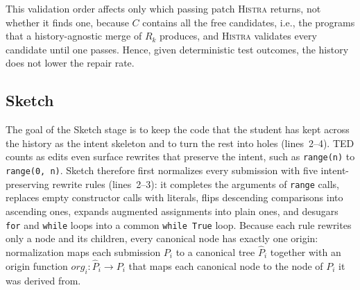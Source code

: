\documentclass[10pt,conference]{IEEEtran}
\begin{document}
This validation order affects only which passing patch \textsc{Histra} returns, not whether it finds one, because $C$ contains all the free candidates, i.e., the programs that a history-agnostic merge of $R_k$ produces, and \textsc{Histra} validates every candidate until one passes. Hence, given deterministic test outcomes, the history does not lower the repair rate.

\subsection{Sketch}\label{sec:sketch}

The goal of the Sketch stage is to keep the code that the student has kept across the history as the intent skeleton and to turn the rest into holes (lines~2--4). TED counts as edits even surface rewrites that preserve the intent, such as \texttt{range(n)} to \texttt{range(0, n)}. Sketch therefore first normalizes every submission with five intent-preserving rewrite rules (lines~2--3): it completes the arguments of \texttt{range} calls, replaces empty constructor calls with literals, flips descending comparisons into ascending ones, expands augmented assignments into plain ones, and desugars \texttt{for} and \texttt{while} loops into a common \texttt{while True} loop. Because each rule rewrites only a node and its children, every canonical node has exactly one origin: normalization maps each submission $P_i$ to a canonical tree $\hat{P}_i$ together with an origin function $\mathit{org}_i : \hat{P}_i \to P_i$ that maps each canonical node to the node of $P_i$ it was derived from.
\end{document}
